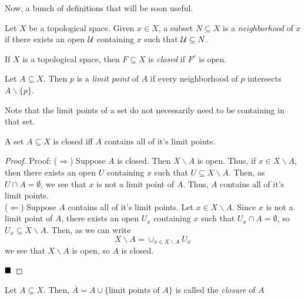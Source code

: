 Now, a bunch of definitions that will be soon useful.

\begin{definition}
    Let $X$ be a topological space. Given $x \in X$, a subset $N \subseteq X$ is a \emph{neighborhood} of $x$ if there exists an open $\cal{U}$ containing $x$ such that $\cal{U} \subseteq N$.
\end{definition}

\begin{definition}
    If $X$ is a topological space, then $F \subseteq X$ is \emph{closed} if $F^{c}$ is open.
\end{definition}

\begin{definition}
    Let $A \subseteq X$. Then $p$ is a \emph{limit point} of $A$ if every neighborhood of $p$ intersects $A \backslash \{p\}$. 
\end{definition}
Note that the limit points of a set do not necessarily need to be containing in that set.\\

\begin{lemma}
    A set $A \subseteq X$ is closed iff $A$ contains all of it's limit points.
\end{lemma}
\begin{proof}{Proof:}
    ($\Rightarrow$) Suppose $A$ is closed. Then $X \backslash A$ is open. Thus, if $x \in X \backslash A$, then there exists an open $U$ containing $x$ such that $U \subseteq X \backslash A$. Then, as $U \cap A = \emptyset$, we see that $x$ is not a limit point of $A$. Thus, $A$ contains all of it's limit points.\\

    ($\Leftarrow$) Suppose $A$ contains all of it's limit points. Let $x \in X \backslash A$. Since $x$ is not a limit point of $A$, there exists an open $U_{x}$ containing $x$ such that $U_{x} \cap A = \emptyset$, so $U_{x} \subseteq X \backslash A$. Then, as we can write
    \[ X \backslash A = \cup_{x \in X \backslash A} U_{x} \]
    we see that $X \backslash A$ is open, so $A$ is closed.

    $\qed$
\end{proof}

\begin{definition}
    Let $A \subseteq X$. Then, $\overline{A} = A \cup \{\text{limit points of } A\}$ is called the \emph{closure} of $A$
\end{definition}

